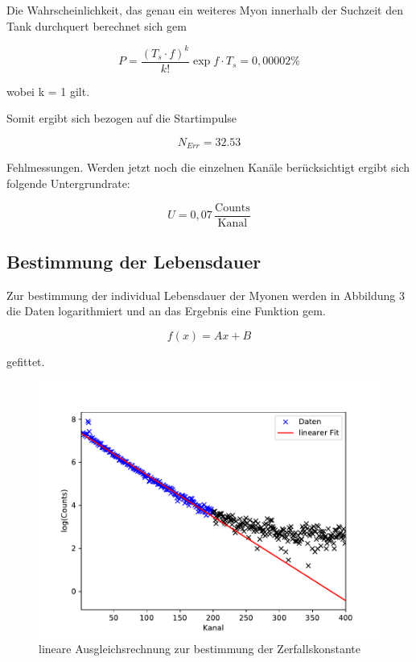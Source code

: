 \noindent Die Wahrscheinlichkeit, das genau ein weiteres Myon innerhalb der Suchzeit den Tank durchquert berechnet sich gem

\begin{equation}
P = \frac{(T_s \cdot f)^k}{k!} \exp{f \cdot T_s} = 0,00002 \%
\end{equation}

\noindent wobei k = 1 gilt.

\noindent Somit ergibt sich bezogen auf die Startimpulse 

\begin{equation}
N_{Err} = 32.53
\end{equation}

\noindent Fehlmessungen. Werden jetzt noch die einzelnen Kanäle berücksichtigt ergibt sich folgende Untergrundrate:

\begin{equation}
U = 0,07 \, \frac{\text{Counts}}{\text{Kanal}}
\end{equation}
\subsection{Bestimmung der Lebensdauer}
\label{subsec:lifetime}
Zur bestimmung der individual Lebensdauer der Myonen werden in Abbildung 3 die Daten logarithmiert und an das Ergebnis eine Funktion gem.

\begin{equation}
f(x) = Ax + B
\end{equation}

\noindent gefittet. 

\begin{figure}
	\centering
	\includegraphics[width=\textwidth]{img/myons.pdf}
	\caption{lineare Ausgleichsrechnung zur bestimmung der Zerfallskonstante}
	\label{abb:fit}
\end{figure}

